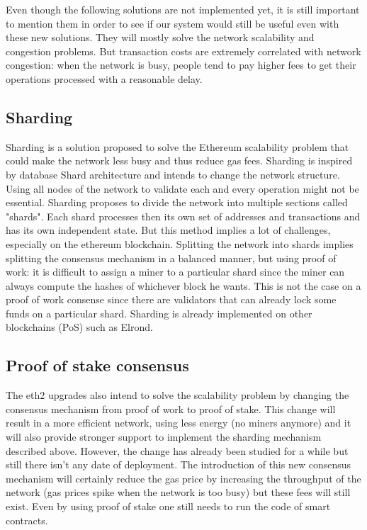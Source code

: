 Even though the following solutions are not implemented yet, it is still important to mention them in order to see if our system would still be useful even with these new solutions. They will mostly solve the network scalability and congestion problems. But transaction costs are extremely correlated with network congestion: when the network is busy, people tend to pay higher fees to get their operations processed with a reasonable delay. 
\subsection{Sharding}
Sharding is a solution proposed to solve the Ethereum scalability problem that could make the network less busy and thus reduce gas fees. Sharding is inspired by database Shard architecture and intends to change the network structure. Using all nodes of the network to validate each and every operation might not be essential. Sharding proposes to divide the network into multiple sections called "shards". Each shard processes then its own set of addresses and transactions and has its own independent state.
But this method implies a lot of challenges, especially on the ethereum blockchain. Splitting the network into shards implies splitting the consensus mechanism in a balanced manner, but using proof of work: it is difficult to assign a miner to a particular shard since the miner can always compute the hashes of whichever block he wants. This is not the case on a proof of work consense since there are validators that can already lock some funds on a particular shard.
Sharding is already implemented on other blockchains (PoS) such as Elrond. 
\subsection{Proof of stake consensus}
The eth2 upgrades also intend to solve the scalability problem by changing the consensus mechanism from proof of work to proof of stake. This change will result in a more efficient network, using less energy (no miners anymore) and it will also provide stronger support to implement the sharding mechanism described above. However, the change has already been studied for a while but still there isn't any date of deployment. The introduction of this new consensus mechanism will certainly reduce the gas price by increasing the throughput of the network (gas prices spike when the network is too busy) but these fees will still exist. Even by using proof of stake one still needs to run the code of smart contracts.